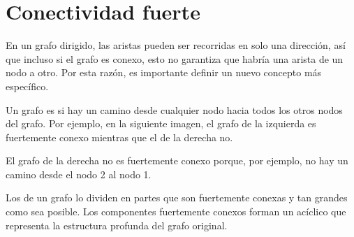 \chapter{Conectividad fuerte}


En un grafo dirigido, las aristas pueden ser recorridas en solo
una dirección, así que incluso si el grafo es conexo, esto no
garantiza que habría una arista de un nodo a otro. Por esta razón,
es importante definir un nuevo concepto más específico.

Un grafo es  si hay un camino desde cualquier
nodo hacia todos los otros nodos del grafo. Por ejemplo, en la siguiente
imagen, el grafo de la izquierda es fuertemente conexo mientras que
el de la derecha no.

\begin{center}
\end{center}

El grafo de la derecha no es fuertemente conexo porque, por ejemplo,
no hay un camino desde el nodo 2 al nodo 1.


Los  de un grafo lo dividen
en partes que son fuertemente conexas y tan grandes como sea posible.
Los componentes fuertemente conexos forman un 
acíclico que representa la estructura profunda del grafo original.

